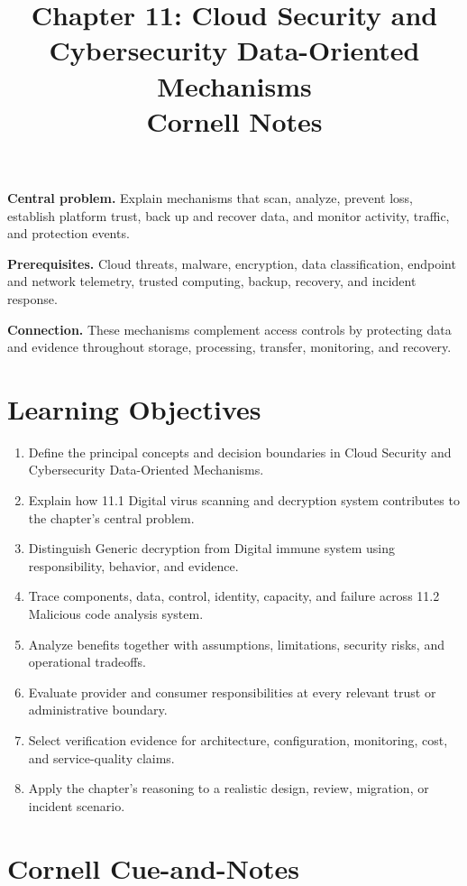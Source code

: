 \documentclass[11pt]{article}
\title{Chapter 11: Cloud Security and Cybersecurity Data-Oriented Mechanisms\\[2mm]\large Cornell Notes}
\author{}
\date{}
\begin{document}
\maketitle
\thispagestyle{fancy}
\vspace{-1.5em}
\begin{orientationbox}
\textbf{Central problem.} Explain mechanisms that scan, analyze, prevent loss, establish platform trust, back up and recover data, and monitor activity, traffic, and protection events.\par\smallskip
\textbf{Prerequisites.} Cloud threats, malware, encryption, data classification, endpoint and network telemetry, trusted computing, backup, recovery, and incident response.\par\smallskip
\textbf{Connection.} These mechanisms complement access controls by protecting data and evidence throughout storage, processing, transfer, monitoring, and recovery.
\end{orientationbox}
\section{Learning Objectives}
\begin{enumerate}
\item Define the principal concepts and decision boundaries in Cloud Security and Cybersecurity Data-Oriented Mechanisms.
\item Explain how 11.1 Digital virus scanning and decryption system contributes to the chapter's central problem.
\item Distinguish Generic decryption from Digital immune system using responsibility, behavior, and evidence.
\item Trace components, data, control, identity, capacity, and failure across 11.2 Malicious code analysis system.
\item Analyze benefits together with assumptions, limitations, security risks, and operational tradeoffs.
\item Evaluate provider and consumer responsibilities at every relevant trust or administrative boundary.
\item Select verification evidence for architecture, configuration, monitoring, cost, and service-quality claims.
\item Apply the chapter's reasoning to a realistic design, review, migration, or incident scenario.
\end{enumerate}
\section{Cornell Cue-and-Notes}
\end{document}
